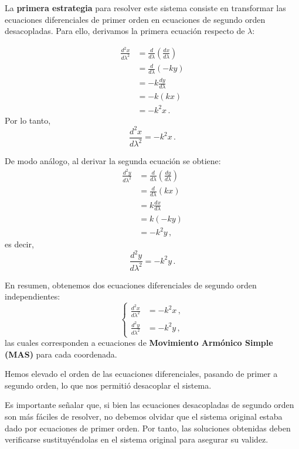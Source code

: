 \documentclass[../apunte_mecanica_clasica.tex]{subfiles}%
\begin{document}
La \textbf{primera estrategia} para resolver este sistema consiste en transformar las ecuaciones diferenciales de primer orden en ecuaciones de segundo orden desacopladas. Para ello, derivamos la primera ecuación respecto de $\lambda$:

\begin{align*}
\frac{d^2x}{d\lambda^2} &= \frac{d}{d\lambda} \left( \frac{dx}{d\lambda} \right) \\
&= \frac{d}{d\lambda}(-ky) \\
&= -k \frac{dy}{d\lambda} \\[2pt]
&= -k ( kx) \\[2pt]
&= -k^2 x \,.
\end{align*}
Por lo tanto,
\begin{equation*}
\frac{d^2x}{d\lambda^2} = -k^2 x\,.
\end{equation*}

De modo análogo, al derivar la segunda ecuación se obtiene:
\begin{align*}
\frac{d^2y}{d\lambda^2} &= \frac{d}{d\lambda} \left( \frac{dy}{d\lambda} \right) \\
&= \frac{d}{d\lambda} (kx) \\
&= k \frac{dx}{d\lambda} \\
&= k (-ky) \\
&= -k^2 y \,,
\end{align*}
es decir,
\begin{equation*}
\frac{d^2y}{d\lambda^2} = -k^2 y\,.
\end{equation*}

En resumen, obtenemos dos ecuaciones diferenciales de segundo orden independientes:
\begin{equation*}
\left\{
\begin{aligned}
\frac{d^2x}{d\lambda^2} &= -k^2 x\,, \\
\frac{d^2y}{d\lambda^2} &= -k^2 y\,,
\end{aligned}
\right.
\end{equation*}
las cuales corresponden a ecuaciones de \textbf{Movimiento Armónico Simple (MAS)} para cada coordenada.

Hemos elevado el orden de las ecuaciones diferenciales, pasando de primer a segundo orden, lo que nos permitió desacoplar el sistema.

Es importante señalar que, si bien las ecuaciones desacopladas de segundo orden son más fáciles de resolver, no debemos olvidar que el sistema original estaba dado por ecuaciones de primer orden. Por tanto, las soluciones obtenidas deben verificarse sustituyéndolas en el sistema original para asegurar su validez.
\end{document}
